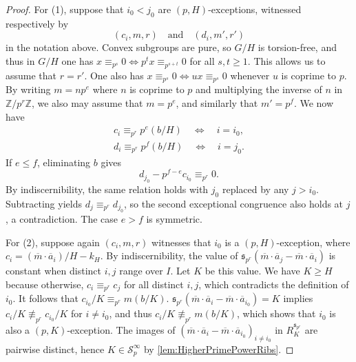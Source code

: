 \documentclass{article}
\theoremstyle{definition}
\theoremstyle{remark}
\theoremstyle{plain}
\begin{document}
\begin{proof}
	For (1), suppose that $i_0 < j_0$ are $(p,H)$-exceptions, witnessed respectively by
	\[
		(c_i,m,r)
		\quad\text{and}\quad
		(d_i,m',r')
	\]
	in the notation above.
	Convex subgroups are pure, so $G/H$ is torsion-free, and thus in $G/H$ one has $x \equiv_{p^s} 0 \Longleftrightarrow p^t x \equiv_{p^{s+t}} 0$ for all $s,t \geq 1$.
	This allows us to assume that $r = r'$.
	One also has $x \equiv_{p^s} 0 \Longleftrightarrow u x \equiv_{p^s} 0$ whenever $u$ is coprime to $p$.
	By writing $m = n p^e$ where $n$ is coprime to $p$ and multiplying the inverse of $n$ in $\mathbb{Z} / p^r \mathbb{Z}$, we also may assume that $m = p^e$, and similarly that $m' = p^f$.
	We now have
	\begin{gather*}
		c_i \equiv_{p^r} p^e (b/H) \quad \Longleftrightarrow \quad i = i_0,\\
		d_i \equiv_{p^r} p^f (b/H) \quad \Longleftrightarrow \quad i = j_0.
	\end{gather*}
	If $e\leq f$, eliminating $b$ gives
	\[
		d_{j_0}-p^{f-e}c_{i_0}
		\equiv_{p^r}
		0.
	\]
	By indiscernibility, the same relation holds with $j_0$ replaced by any $j>i_0$.
	Subtracting yields $d_j\equiv_{p^r}d_{j_0}$, so the second exceptional congruence also holds at $j$, a contradiction.
	The case $e>f$ is symmetric.

	For (2), suppose again $(c_i,m,r)$ witnesses that $i_0$ is a $(p,H)$-exception, where $c_i = (\overline{m}\cdot\overline{a}_i)/H-k_H$.
	By indiscernibility, the value of $\mathfrak{s}_{p^r}(\overline{m}\cdot\overline{a}_j - \overline{m}\cdot\overline{a}_i)$ is constant when distinct $i, j$ range over $I$.
	Let $K$ be this value.
	We have $K \geq H$ because otherwise, $c_i \equiv_{p^r} c_j$ for all distinct $i, j$, which contradicts the definition of $i_0$.
	It follows that $c_{i_0} / K \equiv_{p^r} m(b/K)$.
	$\mathfrak{s}_{p^r}(\overline{m}\cdot\overline{a}_i - \overline{m}\cdot\overline{a}_{i_0}) = K$ implies $c_i / K \not\equiv_{p^r} c_{i_0} / K$ for $i \neq i_0$, and thus $c_i / K \not\equiv_{p^r} m(b/K)$, which shows that $i_0$ is also a $(p,K)$-exception.
	The images of $(\overline{m}\cdot\overline{a}_i - \overline{m}\cdot\overline{a}_{i_0})_{i \neq i_0}$ in $R_K^{\mathfrak{s}_{p^r}}$ are pairwise distinct, hence $K\in\mathcal{S}_p^\infty$ by \autoref{lem:HigherPrimePowerRibs}.
\end{proof}
\end{document}
